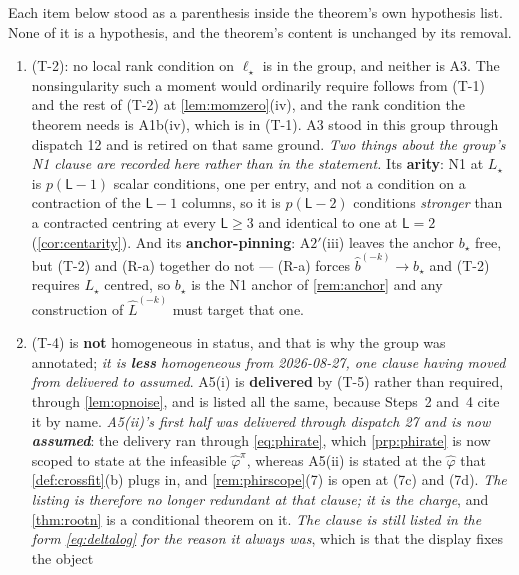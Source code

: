 \begin{remark}\label{rem:rootngroups}
Each item below stood as a parenthesis inside the theorem's own hypothesis list. None of it is a
hypothesis, and the theorem's content is unchanged by its removal.
\begin{enumerate}
\item[(1)] \textup{(T-2)}: no local rank condition on $\ell_\star$ is in the group, and neither is
A3. The nonsingularity such a moment would ordinarily require follows from (T-1) and the rest of (T-2) at
\cref{lem:momzero}\textup{(iv)}, and the rank condition the theorem needs is A1b(iv), which is in (T-1).
A3 stood in this group through dispatch 12 and is retired on that same ground.
\emph{Two things about the group's N1 clause are recorded here rather than in the statement.} Its
\textbf{arity}: N1 at $L_\star$ is $p(\mathsf L-1)$ scalar conditions, one per entry, and not a
condition on a contraction of the $\mathsf L-1$ columns, so it is $p(\mathsf L-2)$ conditions
\emph{stronger} than a contracted centring at every $\mathsf L\ge3$ and identical to one at
$\mathsf L=2$ (\cref{cor:centarity}). And its \textbf{anchor-pinning}: A$2'$(iii) leaves the anchor
$b_\star$ free, but (T-2) and (R-a) together do not --- (R-a) forces $\hat b^{(-k)}\to b_\star$ and
(T-2) requires $L_\star$ centred, so $b_\star$ is the N1 anchor of \cref{rem:anchor} and any
construction of $\hat L^{(-k)}$ must target that one.
\item[(2)] \textup{(T-4)} is \textbf{not} homogeneous in status, and that is why the group was
annotated; \emph{it is \textbf{less} homogeneous from 2026-08-27, one clause having moved from
delivered to assumed}. A5(i) is \textbf{delivered} by (T-5)
rather than required, through \cref{lem:opnoise}, and is listed all the same, because Steps~2 and~4 cite
it by name.
\emph{A5(ii)'s first half was delivered through dispatch 27 and is now \textbf{assumed}}: the delivery
ran through \eqref{eq:phirate}, which \cref{prp:phirate} is now scoped to state at the infeasible
$\hat\varphi^{\pi}$, whereas A5(ii) is stated at the $\hat\varphi$ that
\cref{def:crossfit}\textup{(b)} plugs in, and \cref{rem:phirscope}\textup{(7)} is open at
\textup{(7c)} and \textup{(7d)}. \emph{The listing is therefore no longer redundant at that clause; it
is the charge}, and \cref{thm:rootn} is a conditional theorem on it. \emph{The clause is still listed in
the form \eqref{eq:deltalog} for the reason it always was}, which is that the display fixes the object

\end{enumerate}
\end{remark}
